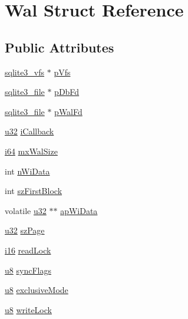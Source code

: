 \hypertarget{struct_wal}{\section{Wal Struct Reference}
\label{struct_wal}
}
\subsection*{Public Attributes}
\begin{DoxyCompactItemize}
\item 
\hyperlink{structsqlite3__vfs}{sqlite3\-\_\-vfs} $\ast$ \hyperlink{struct_wal_a5431b060acbc998a7e3710587abaa11e}{p\-Vfs}
\item 
\hyperlink{structsqlite3__file}{sqlite3\-\_\-file} $\ast$ \hyperlink{struct_wal_a3a4d051c55228e554b36691c5095ed14}{p\-Db\-Fd}
\item 
\hyperlink{structsqlite3__file}{sqlite3\-\_\-file} $\ast$ \hyperlink{struct_wal_aea2a72ead42cfe57e3a6809e80884397}{p\-Wal\-Fd}
\item 
\hyperlink{sqlite3_8c_a03ad5adfaeb9b7640dde78a0cc390319}{u32} \hyperlink{struct_wal_aae230a2317817739a5f08ebb28b644b0}{i\-Callback}
\item 
\hyperlink{sqlite3_8c_a2a0f0f4ae7001eb54351f77ea1cdbcfd}{i64} \hyperlink{struct_wal_a413f9f82c15d31627a2ed6eac9b6cc27}{mx\-Wal\-Size}
\item 
int \hyperlink{struct_wal_ae3e69420adab92acd90dd7c03d37815f}{n\-Wi\-Data}
\item 
int \hyperlink{struct_wal_a901c02626270f4d51db89786e4994da9}{sz\-First\-Block}
\item 
volatile \hyperlink{sqlite3_8c_a03ad5adfaeb9b7640dde78a0cc390319}{u32} $\ast$$\ast$ \hyperlink{struct_wal_a2b0078e3adfd1fb21794561bb12bbfac}{ap\-Wi\-Data}
\item 
\hyperlink{sqlite3_8c_a03ad5adfaeb9b7640dde78a0cc390319}{u32} \hyperlink{struct_wal_a771c3a8c81326babc7d623255a6034c5}{sz\-Page}
\item 
\hyperlink{sqlite3_8c_a7b32340f65cd15f029caad258fb3355c}{i16} \hyperlink{struct_wal_a260550c859ac7224fbdad0586dca664a}{read\-Lock}
\item 
\hyperlink{sqlite3_8c_a74a0f6424ae628af25f23f0a35f6ead3}{u8} \hyperlink{struct_wal_ac1382875f5fe049ccf09f1c2d370c429}{sync\-Flags}
\item 
\hyperlink{sqlite3_8c_a74a0f6424ae628af25f23f0a35f6ead3}{u8} \hyperlink{struct_wal_ada255c96ca65d9d8955bbf139af4e6f4}{exclusive\-Mode}
\item 
\hyperlink{sqlite3_8c_a74a0f6424ae628af25f23f0a35f6ead3}{u8} \hyperlink{struct_wal_ad7f4ba84f07115b7ce3a6133479c9d24}{write\-Lock}
$$
\end{DoxyCompactItemize}
